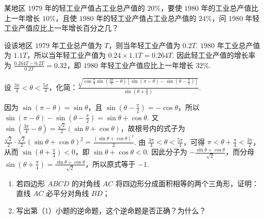 \documentclass[UTF8,a4paper,oneside,11pt]{ctexbook}
\begin{document}
\begin{problem}
某地区 \(1979\) 年的轻工业产值占工业总产值的 \(20\%\)，要使 \(1980\) 年的工业总产值比上一年增长 \(10\%\)，且使 \(1980\) 年的轻工业产值占工业总产值的 \(24\%\)，问 \(1980\) 年轻工业产值应比上一年增长百分之几？
\end{problem}

\begin{solution}
设该地区 \(1979\) 年工业总产值为 \(T\)，则当年轻工业产值为 \(0.2T\). \(1980\) 年工业总产值为 \(1.1T\)，所以当年轻工业产值为 \(0.24\times1.1T=0.264T\). 因此轻工业产值的增长率为 \(\frac{0.264T-0.2T}{0.2T}=0.32\)，即 \(1980\) 年轻工业产值应比上一年增长 \(32\%\).
\end{solution}

\begin{problem}
设 \(\frac{3\pi}{4}<\theta<\frac{5\pi}{4}\)，化简：\(\frac{\sqrt{\cos\frac{\pi}{4}\sin\left(\frac{3\pi}{4}-\theta\right)\left[\sin(\pi-\theta)-\sin\left(\theta-\frac{\pi}{2}\right)\right]}}{\sin\left(\theta+\frac{\pi}{4}\right)}\).
\end{problem}

\begin{solution}
因为 \(\sin(\pi-\theta)=\sin\theta\)，且 \(\sin\left(\theta-\frac{\pi}{2}\right)=-\cos\theta\)，所以
\(\sin(\pi-\theta)-\sin\left(\theta-\frac{\pi}{2}\right)=\sin\theta+\cos\theta\). 又 \(\sin\left(\frac{3\pi}{4}-\theta\right)=\frac{\sqrt{2}}{2}(\sin\theta+\cos\theta)\)，故根号内的式子为 \(\frac{\sqrt{2}}{2}\cdot\frac{\sqrt{2}}{2}(\sin\theta+\cos\theta)^2=\frac{(\sin\theta+\cos\theta)^2}{2}\). 由 \(\frac{3\pi}{4}<\theta<\frac{5\pi}{4}\)，可得 \(\pi<\theta+\frac{\pi}{4}<\frac{3\pi}{2}\)，从而 \(\sin\left(\theta+\frac{\pi}{4}\right)<0\)，即 \(\sin\theta+\cos\theta<0\). 因此分子为 \(-\frac{\sin\theta+\cos\theta}{\sqrt{2}}\)，而分母 \(\sin\left(\theta+\frac{\pi}{4}\right)=\frac{\sin\theta+\cos\theta}{\sqrt{2}}\)，所以原式等于 \(-1\).
\end{solution}

\begin{problem}
\begin{enumerate}
\item 若四边形 \(ABCD\) 的对角线 \(AC\) 将四边形分成面积相等的两个三角形，证明：直线 \(AC\) 必平分对角线 \(BD\)；
\item 写出第（1）小题的逆命题，这个逆命题是否正确？为什么？
\end{enumerate}
\end{problem}
\end{document}
